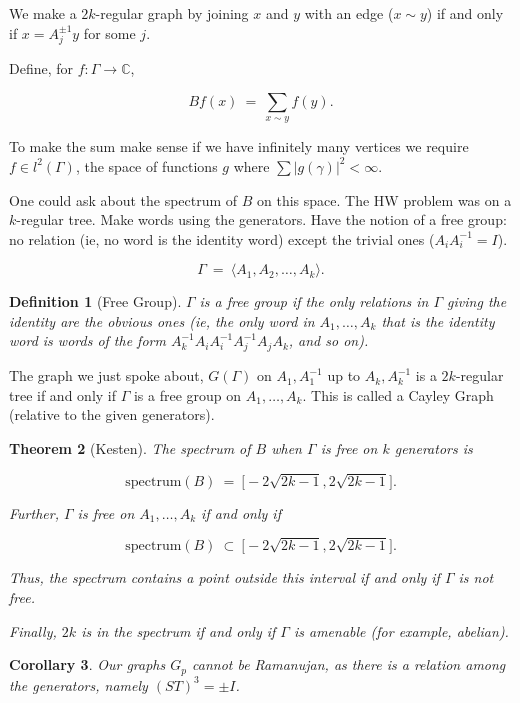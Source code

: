 \documentclass[12pt,letterpaper]{report}
\newcommand\be{\begin{equation}}
\newcommand\ee{\end{equation}}
\newcommand{\C}{\ensuremath{\mathbb{C}}}
\newtheorem{thm}{Theorem}[section]
\newtheorem{cor}[thm]{Corollary}
\newtheorem{defi}[thm]{Definition}
\begin{document}
We make a $2k$-regular graph by joining $x$ and $y$ with an edge
($x \sim y$) if and only if $x = A_j^{\pm 1} y$ for some $j$.

Define, for $f: \Gamma \to \C$,

\be Bf(x) \ = \ \sum_{x \sim y} f(y). \ee

To make the sum make sense if we have infinitely many vertices we
require $f \in l^2(\Gamma)$, the space of functions $g$ where
$\sum |g(\gamma)|^2 < \infty$.

One could ask about the spectrum of $B$ on this space. The HW
problem was on a $k$-regular tree. Make words using the
generators. Have the notion of a free group: no relation (ie, no
word is the identity word) except the trivial ones ($A_i A_i^{-1}
= I$).

\be \Gamma \ = \ \langle A_1, A_2, \dots, A_k \rangle. \ee

\begin{defi}[Free Group] $\Gamma$ is a free group if the only
relations in $\Gamma$ giving the identity are the obvious ones
(ie, the only word in $A_1, \dots, A_k$ that is the identity word
is words of the form $A_k^{-1} A_i A_i^{-1} A_j^{-1} A_j A_k$, and
so on).
\end{defi}

The graph we just spoke about, $G(\Gamma)$ on $A_1,A_1^{-1}$ up to
$A_k,A_k^{-1}$ is a $2k$-regular tree if and only if $\Gamma$ is a
free group on $A_1,\dots,A_k$. This is called a Cayley Graph
(relative to the given generators).

\begin{thm}[Kesten] The spectrum of $B$ when $\Gamma$ is free on
$k$ generators is

\be \text{spectrum}(B) \ = \ \Big[-2\sqrt{2k-1},2\sqrt{2k-1}\Big].
\ee

Further, $\Gamma$ is free on $A_1, \dots, A_k$ if and only if

\be \text{spectrum}(B) \ \subset \
\Big[-2\sqrt{2k-1},2\sqrt{2k-1}\Big]. \ee

Thus, the spectrum contains a point \emph{outside} this interval
if and only if $\Gamma$ is not free.

Finally, $2k$ is in the spectrum if and only if $\Gamma$ is
amenable (for example, abelian).

\end{thm}


\begin{cor} Our graphs $G_p$ cannot be Ramanujan, as there
\emph{is} a relation among the generators, namely $(ST)^3 = \pm
I$. \end{cor}
\end{document}
